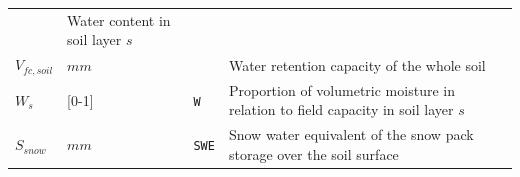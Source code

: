 \documentclass[]{book}
\begin{document}
\begin{longtable}[]{@{}llll@{}}
\begin{minipage}[t]{0.12\columnwidth}
\strut
\end{minipage} & \begin{minipage}[t]{0.45\columnwidth}\raggedright\strut
Water content in soil layer \(s\)\strut
\end{minipage}\tabularnewline
\begin{minipage}[t]{0.11\columnwidth}\raggedright\strut
\(V_{fc, soil}\)\strut
\end{minipage} & \begin{minipage}[t]{0.10\columnwidth}\raggedright\strut
\(mm\)\strut
\end{minipage} & \begin{minipage}[t]{0.12\columnwidth}\raggedright\strut
\strut
\end{minipage} & \begin{minipage}[t]{0.45\columnwidth}\raggedright\strut
Water retention capacity of the whole soil\strut
\end{minipage}\tabularnewline
\begin{minipage}[t]{0.11\columnwidth}\raggedright\strut
\(W_{s}\)\strut
\end{minipage} & \begin{minipage}[t]{0.10\columnwidth}\raggedright\strut
{[}0-1{]}\strut
\end{minipage} & \begin{minipage}[t]{0.12\columnwidth}\raggedright\strut
\texttt{W}\strut
\end{minipage} & \begin{minipage}[t]{0.45\columnwidth}\raggedright\strut
Proportion of volumetric moisture in relation to field capacity in soil
layer \(s\)\strut
\end{minipage}\tabularnewline
\begin{minipage}[t]{0.11\columnwidth}\raggedright\strut
\(S_{snow}\)\strut
\end{minipage} & \begin{minipage}[t]{0.10\columnwidth}\raggedright\strut
\(mm\)\strut
\end{minipage} & \begin{minipage}[t]{0.12\columnwidth}\raggedright\strut
\texttt{SWE}\strut
\end{minipage} & \begin{minipage}[t]{0.45\columnwidth}\raggedright\strut
Snow water equivalent of the snow pack storage over the soil
surface\strut
\end{minipage}\tabularnewline
\bottomrule
\end{longtable}
\end{document}
